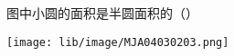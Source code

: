 图中小圆的面积是半圆面积的\hfill （\quad）


\begin{center}

    \texttt{[image: lib/image/MJA04030203.png]}

\end{center}



